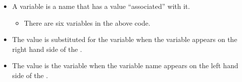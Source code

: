 \documentclass[letterpaper,10pt,english]{sphinxmanual}
\begin{document}
\begin{itemize}
\item {} 
A variable is a name that has a value “associated” with it.
\begin{itemize}
\item {} 
There are six variables in the above code.

\end{itemize}

\item {} 
The value is substituted for the variable when the variable
appears on the right hand side of the \sphinxcode{\sphinxupquote{=}}.

\item {} 
The value is  the variable when the variable name
appears on the left hand side of the \sphinxcode{\sphinxupquote{=}}.

\end{itemize}
\end{document}
